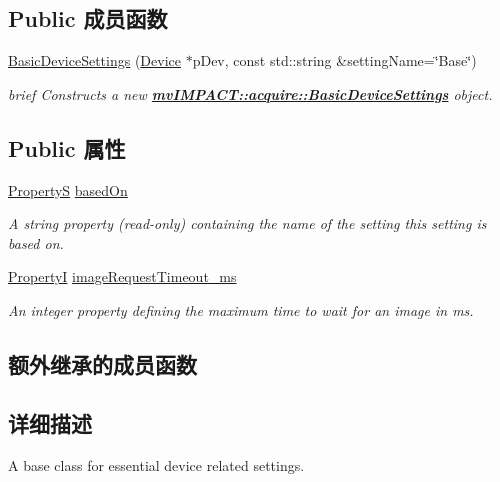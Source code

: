 \subsection*{Public 成员函数}
\begin{DoxyCompactItemize}
\item 
\hyperlink{classmv_i_m_p_a_c_t_1_1acquire_1_1_basic_device_settings_a4956794c96ca7afea6910d6fdbfd3257}{Basic\+Device\+Settings} (\hyperlink{classmv_i_m_p_a_c_t_1_1acquire_1_1_device}{Device} $\ast$p\+Dev, const std\+::string \&setting\+Name=\char`\"{}Base\char`\"{})
\begin{DoxyCompactList}\small\item\em brief Constructs a new {\bfseries \hyperlink{classmv_i_m_p_a_c_t_1_1acquire_1_1_basic_device_settings}{mv\+I\+M\+P\+A\+C\+T\+::acquire\+::\+Basic\+Device\+Settings}} object. \end{DoxyCompactList}\end{DoxyCompactItemize}
\subsection*{Public 属性}
\begin{DoxyCompactItemize}
\item 
\hyperlink{classmv_i_m_p_a_c_t_1_1acquire_1_1_property_s}{Property\+S} \hyperlink{classmv_i_m_p_a_c_t_1_1acquire_1_1_basic_device_settings_aa6ca2a2fe4794fbc5bf638b48440eac1}{based\+On}
\begin{DoxyCompactList}\small\item\em A string property {\bfseries }(read-\/only) containing the name of the setting this setting is based on. \end{DoxyCompactList}\item 
\hyperlink{group___common_interface_ga12d5e434238ca242a1ba4c6c3ea45780}{Property\+I} \hyperlink{classmv_i_m_p_a_c_t_1_1acquire_1_1_basic_device_settings_a5bbc413a2afe5a1d8eb673ba14047ae2}{image\+Request\+Timeout\+\_\+ms}
\begin{DoxyCompactList}\small\item\em An integer property defining the maximum time to wait for an image in ms. \end{DoxyCompactList}\end{DoxyCompactItemize}
\subsection*{额外继承的成员函数}


\subsection{详细描述}
A base class for essential device related settings. 

